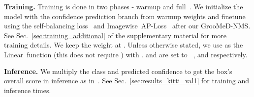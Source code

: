 \documentclass[final]{cvpr}
\newcommand{\myReferSection}[1]{Sec.~\ref{#1}}
\newcommand{\methodName}{GrooMeD-NMS}
\newcommand{\ap}{AP}
\newcommand{\aploss}{\ap-Loss}
\newcommand{\imageWise}{Imagewise}
\newcommand{\basic}{Linear}
\begin{document}
\noindent\textbf{Training.}
        Training is done in two phases - warmup and full~\cite{brazil2020kinematic}. 
        We initialize the model with the confidence prediction branch from warmup weights and finetune using the self-balancing loss~\cite{brazil2020kinematic} and \imageWise~\aploss~\cite{chen2020ap} after our \methodName. 
        See \myReferSection{sec:training_additional} of the supplementary material for more training details. 
        We keep the weight  at . 
        Unless otherwise stated, we use  as the \basic~function (this does not require ) with . 
         and  are set to ~\cite{brazil2019m3d, brazil2020kinematic},  and  respectively.

    
\noindent\textbf{Inference.}
        We multiply the class and predicted confidence to get the box's overall score in inference as in~\cite{tychsen2018improving, shi2020distance, kim2020probabilistic}. 
        See \myReferSection{sec:results_kitti_val1} for training and inference times.
\end{document}
